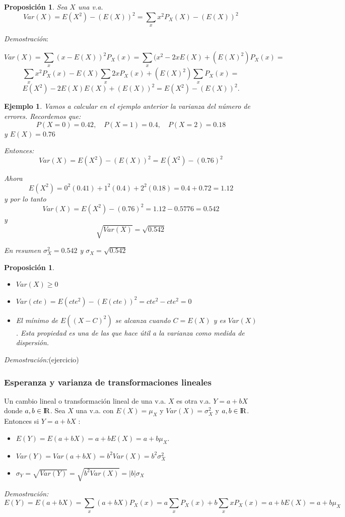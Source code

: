 \documentclass[12pt]{report}
\newtheorem{proposition}[definition]{Proposici\'on}
\newtheorem{example}[definition]{Ejemplo}
\begin{document}
 \begin{proposition} Sea $X$ una v.a.
 $$Var(X)=E(X^2)-(E(X))^2=\sum_{x} x^2 P_{X}(X)-(E(X))^2$$
\end{proposition}
 \textit{Demostración}:

 $$Var(X)=\sum_{x}(x-E(X))^2 P_{X}(x)=\sum_{x}(x^2 -2 x E(X)+(E(X)^2) P_{X}(x) =$$
 $$\sum_{x}x^2P_{X}(x) -E(X)\sum_{x}2 x P_{X}(x)
+(E(X)^2)\sum_{x} P_{X}(x)=$$ $$ E(X^2)- 2 E(X) E(X) + (E(X))^2=E(X^2)-(E(X))^2.
$$

\begin{example}
    Vamos a calcular en  el ejemplo anterior la varianza del número de errores.
    Recordemos que:
    $$P(X=0)=0.42,\quad P(X=1)=0.4, \quad P(X=2)=0.18$$
    y  $E(X)=0.76$

    Entonces:
    $$Var(X)=E(X^2)-(E(X))^2 = E(X^2)-(0.76)^2$$

  Ahora
  $$E(X^2)= 0^2 (0.41)+ 1^2 (0.4)+ 2^2 (0.18)=0.4+0.72=1.12$$
  y por lo tanto
  $$Var(X)= E(X^2)-(0.76)^2=1.12-0.5776=0.542$$
  y $$\sqrt{Var(X)}=\sqrt{0.542}$$

  En resumen $\sigma_{X}^2=0.542$ y $\sigma_{X}=\sqrt{0.542}$
     \end{example}

    \begin{proposition}

    \begin{itemize}
    \item $Var(X)\geq 0$
    \item $Var(cte)=E(cte^2)-(E(cte))^2= cte^2 - cte^2=0$
    \item El mínimo de $E((X-C)^2)$ se alcanza cuando $C=E(X)$ y es $Var(X)$. Esta
    propiedad es una de las que hace útil a la varianza como medida de dispersión.
    \end{itemize}

    \end{proposition}

       \textit{Demostración:}(ejercicio)



\subsubsection{Esperanza y varianza de transformaciones lineales}
 Un cambio lineal o transformación lineal
de una v.a. $X$ es otra v.a. $Y= a+ b X$  donde $a,b\in\mbox{I\kern-.2em\hbox{R}}$. Sea $X$ una v.a. con
$E(X)=\mu_{X}$ y $Var(X)=\sigma_{X}^2$ y $a,b\in\mbox{I\kern-.2em\hbox{R}}$. Entonces si $Y=a+b X$ :
\begin{itemize}
    \item $E(Y)=E(a + b X)=a+ b E(X)= a + b \mu_{X}$.
    \item $Var(Y)=Var(a+bX)=b^2 Var(X)= b^2 \sigma_{X}^2$
    \item $\sigma_{Y}=\sqrt{Var(Y)}=\sqrt{b^2 Var(X)}=|b| \sigma_{X}$
    \end{itemize}
    \textit{Demostración:}
    $$
E(Y)=E(a+bX)=\sum_{x}(a+bX) P_{X}(x)= a \sum_{x} P_{X}(x) + b \sum_{x} x P_{X}(x) =a + b
E(X)=a + b \mu_{X}
$$
\end{document}

